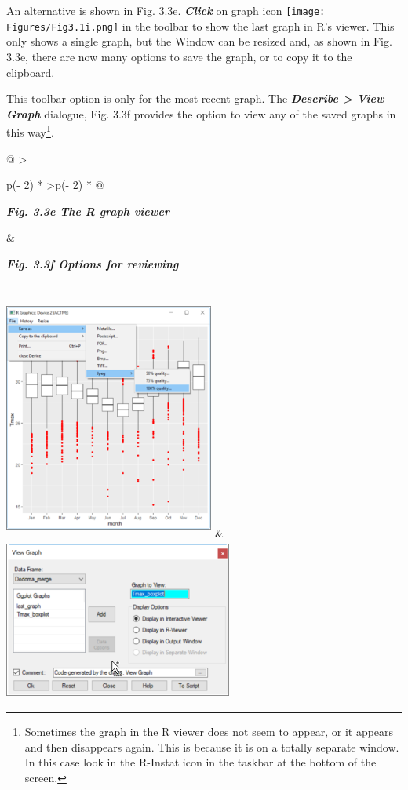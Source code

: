 \documentclass[
  letterpaper,
  DIV=11,
  numbers=noendperiod]{scrreprt}
\begin{document}
An alternative is shown in Fig. 3.3e. \textbf{\emph{Click}} on graph
icon
\texttt{[image: Figures/Fig3.1i.png]}
in the toolbar to show the last graph in R's viewer. This only shows a
single graph, but the Window can be resized and, as shown in Fig. 3.3e,
there are now many options to save the graph, or to copy it to the
clipboard.

This toolbar option is only for the most recent graph. The
\textbf{\emph{Describe \textgreater{} View Graph}} dialogue, Fig. 3.3f
provides the option to view any of the saved graphs in this
way\footnote{Sometimes the graph in the R viewer does not seem to
  appear, or it appears and then disappears again. This is because it is
  on a totally separate window. In this case look in the R-Instat icon
  in the taskbar at the bottom of the screen.}.

\begin{longtable}[]{@{}
  >{\raggedright\arraybackslash}p{(\columnwidth - 2\tabcolsep) * }
  >{\centering\arraybackslash}p{(\columnwidth - 2\tabcolsep) * }@{}}
\toprule\noalign{}
\begin{minipage}[b]{\linewidth}\raggedright
\textbf{\emph{Fig. 3.3e The R graph viewer}}
\end{minipage} & \begin{minipage}[b]{\linewidth}\centering
\textbf{\emph{Fig. 3.3f Options for reviewing}}
\end{minipage} \\
\midrule\noalign{}
\endhead
\bottomrule\noalign{}
\endlastfoot
\includegraphics[width=2.72331in,height=3.1794in]{figures/Fig3.3e.png} &
\includegraphics[width=2.9609in,height=2.08133in]{figures/Fig3.3f.png} \\
\end{longtable}
\end{document}
